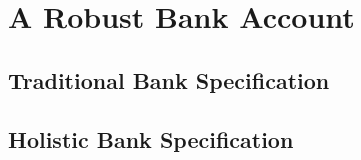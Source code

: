 \section{A Robust Bank Account}

\subsection{Traditional Bank Specification}

\subsection{Holistic Bank Specification}
